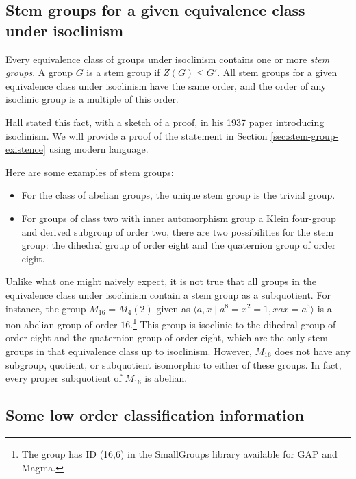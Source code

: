 \documentclass{ucetd}
\begin{document}
\subsection{Stem groups for a given equivalence class under isoclinism}\label{sec:stem-group}

Every equivalence class of groups under isoclinism contains one or
more {\em stem groups}. A group $G$ is a stem group if $Z(G) \le
G'$. All stem groups for a given equivalence class under
isoclinism have the same order, and the order of any isoclinic group is
a multiple of this order.

Hall stated this fact, with a sketch of a proof, in his 1937 paper
introducing isoclinism. We will provide a proof of the statement in
Section \ref{sec:stem-group-existence} using modern language.

Here are some examples of stem groups:

\begin{itemize}
\item For the class of abelian groups, the unique stem group
  is the trivial group. 

\item For groups of class two with inner automorphism group a Klein
  four-group and derived subgroup of order two, there are two
  possibilities for the stem group: the dihedral group of order eight
  and the quaternion group of order eight.

\end{itemize}

Unlike what one might naively expect, it is not true that all groups
in the equivalence class under isoclinism contain a stem group as a
subquotient. For instance, the group $M_{16} = M_4(2)$ given as
$\langle a,x \mid a^8 = x^2 = 1, xax = a^5 \rangle$ is a non-abelian
group of order $16$.\footnote{The group has ID (16,6) in the
  SmallGroups library available for GAP and Magma.} This group is
isoclinic to the dihedral group of order eight and the quaternion
group of order eight, which are the only stem groups in that
equivalence class up to isoclinism. However, $M_{16}$ does not have
any subgroup, quotient, or subquotient isomorphic to either of these
groups. In fact, every proper subquotient of $M_{16}$ is abelian.

\subsection{Some low order classification information}
\end{document}

